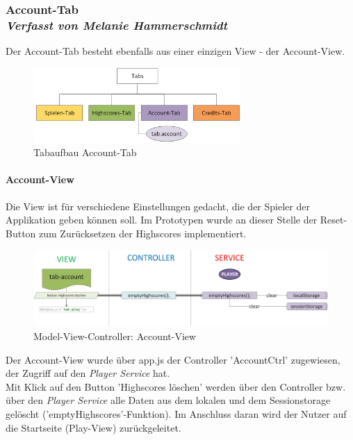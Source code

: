 \subsubsection[Account-Tab]{Account-Tab
 \\ \textnormal{\small{\textit {Verfasst von Melanie Hammerschmidt}}}}
 
Der Account-Tab besteht ebenfalls aus einer einzigen View - der Account-View.
\begin{figure}[h]
\centering
\includegraphics[width=0.7\textwidth]{ref/images/tabs_account.png}
\caption[Tabaufbau Account-Tab]{Tabaufbau Account-Tab}
\label{fig:Tabaufbau Account-Tab}
\end{figure}

\paragraph{Account-View}
%
%
Die View ist für verschiedene Einstellungen gedacht, die der Spieler der Applikation geben können soll. Im Prototypen wurde an dieser Stelle der Reset-Button zum Zurücksetzen der Highscores implementiert.
%
%
\begin{figure}[h]
\centering
\includegraphics[width=1\textwidth]{ref/images/07-account-tab.png}
\caption[Model-View-Controller: Account-View]{Model-View-Controller: Account-View}
\label{fig:MVC:Account-View}
\end{figure}
%
%


Der Account-View wurde über app.js der Controller 'AccountCtrl' zugewiesen, der Zugriff auf den \emph{Player Service} hat.
\\
Mit Klick auf den Button 'Highscores löschen' werden über den Controller bzw. über den \emph{Player Service} alle Daten aus dem lokalen und dem Sessionstorage gelöscht ('emptyHighscores'-Funktion). Im Anschluss daran wird der Nutzer auf die Startseite (Play-View) zurückgeleitet.
